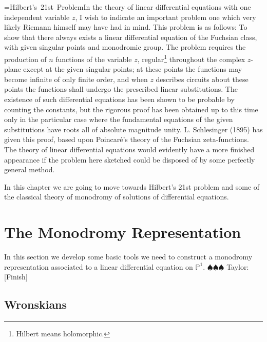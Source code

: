 \documentclass[]{book}
\newcommand{\taylor}[1]{{\color{blue} \sf $\spadesuit\spadesuit\spadesuit$ Taylor: [#1]}}
\numberwithin{equation}{section}
\theoremstyle{definition}
\theoremstyle{remark}
\newcommand{\PP}{\mathbb{P}}
\def\quoteattr#1#2{\setbox0=\hbox{#2}#1\tabto{\dimexpr\linewidth-\wd0}\box0}
\begin{document}
\quoteattr{In the theory of linear differential equations with one independent variable $z$, I wish to indicate an important problem one which very likely Riemann himself may have had in mind. 
	This problem is as follows: To show that there always exists a linear differential equation of the Fuchsian class, with given singular points and monodromic group. 
	The problem requires the production of $n$ functions of the variable $z$, regular\footnote{Hilbert means holomorphic.} throughout the complex $z$-plane except at the given singular points; at these points the functions may become infinite of only finite order, and when $z$ describes circuits about these points the functions shall undergo the prescribed linear substitutions. 
	The existence of such differential equations has been shown to be probable by counting the constants, but the rigorous proof has been obtained up to this time only in the particular case where the fundamental equations of the given substitutions have roots all of absolute magnitude unity. L. Schlesinger (1895) has given this proof, based upon Poincaré's theory of the Fuchsian zeta-functions. 
	The theory of linear differential equations would evidently have a more finished appearance if the problem here sketched could be disposed of by some perfectly general method.}{Hilbert's 21st Problem}

In this chapter we are going to move towards Hilbert's 21st problem and some of the classical theory of monodromy of solutions of differential equations.


\section{The Monodromy Representation}
In this section we develop some basic tools we need to construct a monodromy representation associated to a linear differential equation on $\PP^1$.
\taylor{Finish}

\subsection{Wronskians}
\end{document}
